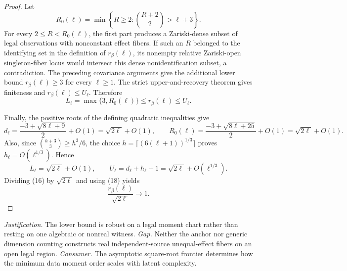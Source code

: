\documentclass{article}
\begin{document}
\begin{proof}
Let
\[
 R_0(\ell)=\min\left\{R\ge2:\binom{R+2}{2}>\ell+3\right\}.
\]
For every \(2\le R<R_0(\ell)\), the first part produces a Zariski-dense subset of legal observations with nonconstant effect fibers.  If such an \(R\) belonged to the identifying set in the definition of \(r_\beta(\ell)\), its nonempty relative Zariski-open singleton-fiber locus would intersect this dense nonidentification subset, a contradiction.  The preceding covariance arguments give the additional lower bound \(r_\beta(\ell)\ge3\) for every \(\ell\ge1\).  The strict upper-and-recovery theorem gives finiteness and \(r_\beta(\ell)\le U_\ell\).  Therefore
\[
 L_\ell=\max\{3,R_0(\ell)\}
 \le r_\beta(\ell)\le U_\ell.
 \tag{16}
\]

Finally, the positive roots of the defining quadratic inequalities give
\[
 d_\ell=\frac{-3+\sqrt{8\ell+9}}{2}+O(1)
          =\sqrt{2\ell}+O(1),
 \qquad
 R_0(\ell)=\frac{-3+\sqrt{8\ell+25}}{2}+O(1)
          =\sqrt{2\ell}+O(1).
 \tag{17}
\]
Also, since \(\binom{h+3}{3}\ge h^3/6\), the choice \(h=\lceil(6(\ell+1))^{1/3}\rceil\) proves \(h_\ell=O(\ell^{1/3})\).  Hence
\[
 L_\ell=\sqrt{2\ell}+O(1),
 \qquad
 U_\ell=d_\ell+h_\ell+1
       =\sqrt{2\ell}+O(\ell^{1/3}).
 \tag{18}
\]
Dividing (16) by \(\sqrt{2\ell}\) and using (18) yields
\[
 \frac{r_\beta(\ell)}{\sqrt{2\ell}}\longrightarrow1.
\]
\end{proof}
\par\smallskip\noindent \textit{Justification.} The lower bound is robust on a legal moment chart rather than resting on one algebraic or nonreal witness. \textit{Gap.} Neither the anchor nor generic dimension counting constructs real independent-source unequal-effect fibers on an open legal region. \textit{Consumer.} The asymptotic square-root frontier determines how the minimum data moment order scales with latent complexity.
\end{document}
